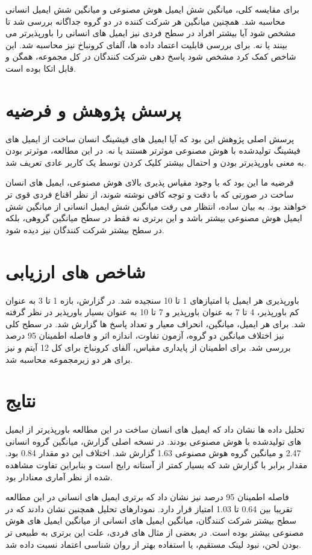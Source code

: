\documentclass[10pt,twocolumn]{article}
\begin{document}
برای مقایسه کلی، میانگین شش ایمیل هوش مصنوعی و میانگین شش ایمیل انسانی محاسبه شد. همچنین میانگین هر شرکت کننده در دو گروه جداگانه بررسی شد تا مشخص شود آیا بیشتر افراد در سطح فردی نیز ایمیل های انسانی را باورپذیرتر می بینند یا نه. برای بررسی قابلیت اعتماد داده ها، آلفای کرونباخ نیز محاسبه شد. این شاخص کمک کرد مشخص شود پاسخ دهی شرکت کنندگان در کل مجموعه، همگن و قابل اتکا بوده است.

\section{پرسش پژوهش و فرضیه}
پرسش اصلی پژوهش این بود که آیا ایمیل های فیشینگ انسان ساخت از ایمیل های فیشینگ تولیدشده با هوش مصنوعی موثرتر هستند یا نه. در این مطالعه، موثرتر بودن به معنی باورپذیرتر بودن و احتمال بیشتر کلیک کردن توسط یک کاربر عادی تعریف شد.

فرضیه ما این بود که با وجود مقیاس پذیری بالای هوش مصنوعی، ایمیل های انسان ساخت در صورتی که با دقت و توجه کافی نوشته شوند، از نظر اقناع فردی قوی تر خواهند بود. به بیان ساده، انتظار می رفت میانگین شش ایمیل انسانی از میانگین شش ایمیل هوش مصنوعی بیشتر باشد و این برتری نه فقط در سطح میانگین گروهی، بلکه در سطح بیشتر شرکت کنندگان نیز دیده شود.

\section{شاخص های ارزیابی}
باورپذیری هر ایمیل با امتیازهای 1 تا 10 سنجیده شد. در گزارش، بازه 1 تا 3 به عنوان کم باورپذیر، 4 تا 7 به عنوان باورپذیر و 7 تا 10 به عنوان بسیار باورپذیر در نظر گرفته شد. برای هر ایمیل، میانگین، انحراف معیار و تعداد پاسخ ها گزارش شد. در سطح کلی نیز اختلاف میانگین دو گروه، آزمون تفاوت، اندازه اثر و فاصله اطمینان 95 درصد بررسی شد. برای اطمینان از پایداری مقیاس، آلفای کرونباخ برای کل 12 آیتم و نیز برای هر دو زیرمجموعه محاسبه شد.

\section{نتایج}
تحلیل داده ها نشان داد که ایمیل های انسان ساخت در این مطالعه باورپذیرتر از ایمیل های تولیدشده با هوش مصنوعی بودند. در نسخه اصلی گزارش، میانگین گروه انسانی 2.47 و میانگین گروه هوش مصنوعی 1.63 گزارش شد. اختلاف این دو مقدار 0.84 بود. مقدار  برابر با  گزارش شد که بسیار کمتر از آستانه رایج  است و بنابراین تفاوت مشاهده شده از نظر آماری معنادار بود.

فاصله اطمینان 95 درصد نیز نشان داد که برتری ایمیل های انسانی در این مطالعه تقریبا بین 0.64 تا 1.03 امتیاز قرار دارد. نمودارهای تحلیل همچنین نشان دادند که در سطح بیشتر شرکت کنندگان، میانگین ایمیل های انسانی از میانگین ایمیل های هوش مصنوعی بیشتر بوده است. در بعضی از مثال های فردی، علت این برتری به طبیعی تر بودن لحن، نبود لینک مستقیم، یا استفاده بهتر از روان شناسی اعتماد نسبت داده شد.
\end{document}
